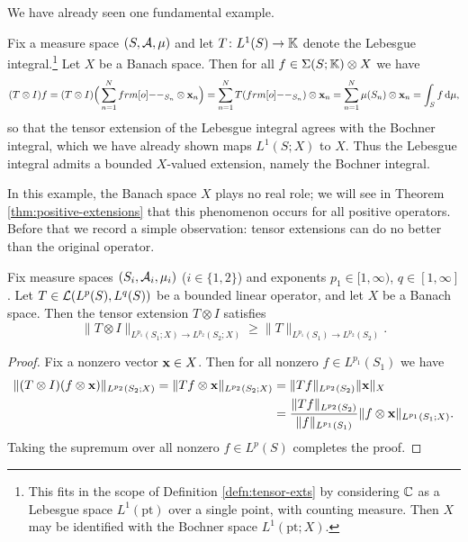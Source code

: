 We have already seen one fundamental example.
\begin{example}
  Fix a measure space $(S,\mathcal{A},\mu)$ and let $T \colon L^1(S) \rightarrow \mathbb{K}$ denote the Lebesgue integral.\footnote{This fits in the scope of Definition \ref{defn:tensor-exts} by considering $\mathbb{C}$ as a Lebesgue space $L^1(\mathrm{pt})$ over a single point, with counting measure. Then $X$ may be identified with the Bochner space $L^1(\mathrm{pt};X)$.}
  Let $X$ be a Banach space.
  Then for all $f \in \Sigma(S;\mathbb{K}) \otimes X$ we have
  \begin{equation*}
    (T \otimes I)f = (T \otimes I)\Big(\sum_{n=1}^N \1_{S_n} \otimes \mb{x}_n \Big) = \sum_{n=1}^N T(\1_{S_n}) \otimes \mb{x}_n = \sum_{n=1}^N \mu(S_n) \otimes \mb{x}_n = \int_S f \, \dd\mu,
  \end{equation*}
  so that the tensor extension of the Lebesgue integral agrees with the Bochner integral, which we have already shown maps $L^1(S;X)$ to $X$.
  Thus the Lebesgue integral admits a bounded $X$-valued extension, namely the Bochner integral.
\end{example}

In this example, the Banach space $X$ plays no real role; we will see in Theorem \ref{thm:positive-extensions} that this phenomenon occurs for all positive operators.
Before that we record a simple observation: tensor extensions can do no better than the original operator.

\begin{prop}
  Fix measure spaces $(S_i,\mathcal{A}_i,\mu_i)$ ($i \in \{1,2\}$) and exponents $p_1 \in [1,\infty)$, $q \in [1,\infty]$.
  Let $T \in \mathcal{L}(L^p(S),L^q(S))$ be a bounded linear operator, and let $X$ be a Banach space.
  Then the tensor extension $T \otimes I$ satisfies
  \begin{equation*}
    \|T \otimes I\|_{L^{p_1}(S_1;X) \to L^{p_2}(S_2;X)} \geq \|T\|_{L^{p_1}(S_1) \to L^{p_2}(S_2)}.
  \end{equation*}
\end{prop}

\begin{proof}
  Fix a nonzero vector $\mathbf{x} \in X$.
  Then for all nonzero $f \in L^{p_1}(S_1)$ we have
  \begin{equation*}
    \begin{aligned}
      \|(T \otimes I)(f \otimes \mathbf{x})\|_{L^{p_2}(S_2;X)} = \|Tf \otimes \mathbf{x}\|_{L^{p_2}(S_2;X)} &= \|Tf\|_{L^{p_2}(S_2)} \|\mathbf{x}\|_X \\
      &= \frac{\|Tf\|_{L^{p_2}(S_2)}}{\|f\|_{L^{p_1}(S_1)}} \|f \otimes \mathbf{x}\|_{L^{p_1}(S_1;X)}.
    \end{aligned}
  \end{equation*}
  Taking the supremum over all nonzero $f \in L^p(S)$ completes the proof.
\end{proof}

